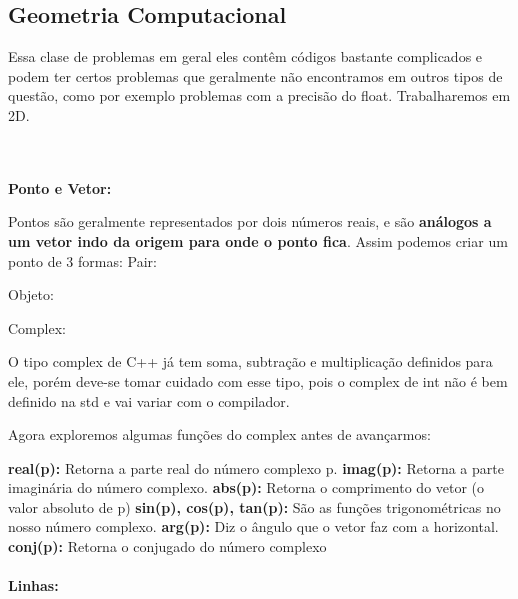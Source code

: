 \documentclass[a4paper,12pt]{article}
\begin{document}
\subsection{Geometria Computacional}
\noindent Essa clase de problemas em geral eles contêm códigos bastante complicados e podem ter certos problemas que geralmente não encontramos em outros tipos de questão, como por exemplo problemas com a precisão do float. Trabalharemos em 2D.

\\~\\\noindent\textbf{Ponto e Vetor:}

\noindent Pontos são geralmente representados por dois números reais, e são \textbf{análogos a um vetor indo da origem para onde o ponto fica}. Assim podemos criar um ponto de 3 formas: Pair:


Objeto:


Complex:


\noindent O tipo complex de C++ já tem soma, subtração e multiplicação definidos para ele, porém deve-se tomar cuidado com esse tipo, pois o complex de int não é bem definido na std e vai variar com o compilador.

\noindent Agora exploremos algumas funções do complex antes de avançarmos:

\newline\noindent\textbf{real(p):} Retorna a parte real do número complexo p.
\newline\noindent\textbf{imag(p):} Retorna a parte imaginária do número complexo.
\newline\noindent\textbf{abs(p):} Retorna o comprimento do vetor (o valor absoluto de p)
\newline\noindent\textbf{sin(p), cos(p), tan(p):} São as funções trigonométricas no nosso número complexo.
\newline\noindent\textbf{arg(p):} Diz o ângulo que o vetor faz com a horizontal.
\newline\noindent\textbf{conj(p):} Retorna o conjugado do número complexo
\\~\\\noindent\textbf{Linhas:}
\end{document}
